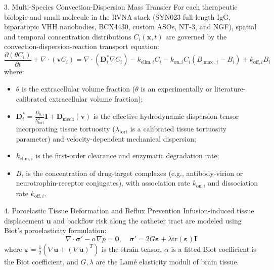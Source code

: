 \documentclass[12pt,a4paper]{article}
\begin{document}
\begin{mathmodelbox}{3. Multi-Species Convection-Dispersion Mass Transfer}
For each therapeutic biologic and small molecule in the RVNA stack (SYN023 full-length IgG, biparatopic VHH nanobodies, BCX4430, custom ASOs, NT-3, and NGF), spatial and temporal concentration distributions $C_i(\mathbf{x}, t)$ are governed by the convection-dispersion-reaction transport equation:
\begin{equation}
\frac{\partial (\theta C_i)}{\partial t} + \nabla \cdot (\mathbf{v} C_i) = \nabla \cdot \left( \mathbf{D}_i^* \nabla C_i \right) - k_{\text{elim}, i} C_i - k_{\text{on}, i} C_i \left( B_{\max, i} - B_i \right) + k_{\text{off}, i} B_i
\end{equation}
where:
\begin{itemize}
    \item $\theta$ is the extracellular volume fraction ($\theta$ is an experimentally or literature-calibrated extracellular volume fraction);
    \item $\mathbf{D}_i^* = \frac{D_{0, i}}{\lambda_{\text{tort}}^2} \mathbf{I} + \mathbf{D}_{\text{mech}}(\mathbf{v})$ is the effective hydrodynamic dispersion tensor incorporating tissue tortuosity ($\lambda_{\text{tort}}$ is a calibrated tissue tortuosity parameter) and velocity-dependent mechanical dispersion;
    \item $k_{\text{elim}, i}$ is the first-order clearance and enzymatic degradation rate;
    \item $B_i$ is the concentration of drug-target complexes (e.g., antibody-virion or neurotrophin-receptor conjugates), with association rate $k_{\text{on}, i}$ and dissociation rate $k_{\text{off}, i}$.
\end{itemize}
\end{mathmodelbox}

\begin{mathmodelbox}{4. Poroelastic Tissue Deformation and Reflux Prevention}
Infusion-induced tissue displacement $\mathbf{u}$ and backflow risk along the catheter tract are modeled using Biot's poroelasticity formulation:
\begin{equation}
\nabla \cdot \boldsymbol{\sigma}' - \alpha \nabla p = \mathbf{0}, \quad \boldsymbol{\sigma}' = 2G \boldsymbol{\varepsilon} + \lambda \text{tr}(\boldsymbol{\varepsilon}) \mathbf{I}
\end{equation}
where $\boldsymbol{\varepsilon} = \frac{1}{2}(\nabla \mathbf{u} + (\nabla \mathbf{u})^T)$ is the strain tensor, $\alpha$ is a fitted Biot coefficient is the Biot coefficient, and $G, \lambda$ are the Lamé elasticity moduli of brain tissue.
\end{mathmodelbox}
\end{document}
